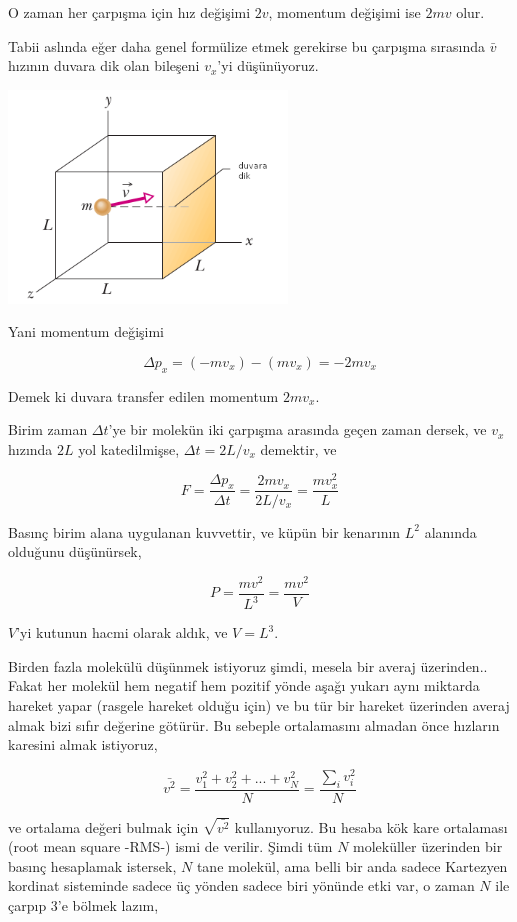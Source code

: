\documentclass[12pt,fleqn]{article}\usepackage{../../common}
\begin{document}
O zaman her çarpışma için hız değişimi $2v$, momentum değişimi ise $2mv$
olur.

Tabii aslında eğer daha genel formülize etmek gerekirse bu çarpışma sırasında
$\bar{v}$ hızının duvara dik olan bileşeni $v_x$'yi düşünüyoruz.

\includegraphics[width=20em]{phy_005_basics_05.png}

Yani momentum değişimi

$$
\Delta p_x = (-m v_x) - (m v_x) = - 2 m v_x 
$$

Demek ki duvara transfer edilen momentum $2 m v_x$. 

Birim zaman $\Delta t$'ye bir molekün iki çarpışma arasında geçen zaman dersek,
ve $v_x$ hızında $2L$ yol katedilmişse, $\Delta t  = 2 L / v_x$ demektir, ve

$$
F = \frac{\Delta p_x}{\Delta t} = \frac{2 m v_x}{2 L / v_x} = \frac{m v_x^2}{L}
$$

Basınç birim alana uygulanan kuvvettir, ve küpün bir kenarının $L^2$ alanında
olduğunu düşünürsek, 

$$
P = \frac{m v^2}{L^3} = \frac{m v^2}{V}
$$

$V$'yi kutunun hacmi olarak aldık, ve $V = L^3$.

Birden fazla molekülü düşünmek istiyoruz şimdi, mesela bir averaj
üzerinden.. Fakat her molekül hem negatif hem pozitif yönde aşağı yukarı aynı
miktarda hareket yapar (rasgele hareket olduğu için) ve bu tür bir hareket
üzerinden averaj almak bizi sıfır değerine götürür. Bu sebeple ortalamasını
almadan önce hızların karesini almak istiyoruz,

$$
\bar{v^2} = \frac{v_1^2 + v_2^2 + ... + v_N^2 }{N} = \frac{\sum_i v_i^2}{N}
$$

ve ortalama değeri bulmak için $\sqrt{\bar{v^2}}$ kullanıyoruz. Bu hesaba kök
kare ortalaması (root mean square -RMS-) ismi de verilir. Şimdi tüm $N$
moleküller üzerinden bir basınç hesaplamak istersek, $N$ tane molekül, ama belli
bir anda sadece Kartezyen kordinat sisteminde sadece üç yönden sadece biri
yönünde etki var, o zaman $N$ ile çarpıp 3'e bölmek lazım, 
\end{document}
